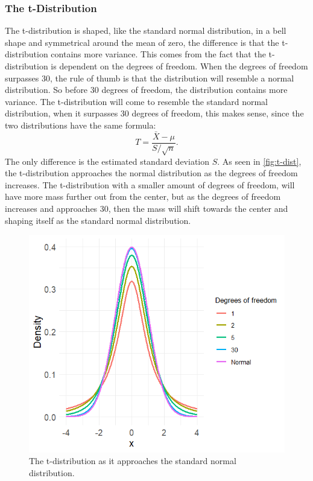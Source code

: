 \subsubsection{The t-Distribution}
The t-distribution is shaped, like the standard normal distribution, in a bell shape and symmetrical around the mean of zero, the difference is that the t-distribution contains more variance. This comes from the fact that the t-distribution is dependent on the degrees of freedom. When the degrees of freedom surpasses 30, the rule of thumb is that the distribution will resemble a normal distribution. So before 30 degrees of freedom, the distribution contains more variance.
The t-distribution will come to resemble the standard normal distribution, when it surpasses 30 degrees of freedom, this makes sense, since the two distributions have the same formula:
\begin{equation}
	T=\frac{\bar{X}-\mu}{S/\sqrt{n}}.
\end{equation}
The only difference is the estimated standard deviation $S$.
As seen in \autoref{fig:t-dist}, the t-distribution approaches the normal distribution as the degrees of freedom increases. The t-distribution with a smaller amount of degrees of freedom, will have more mass further out from the center, but as the degrees of freedom increases and approaches 30, then the mass will shift towards the center and shaping itself as the standard normal distribution.
\begin{figure}[h!]
	\centering
	\begin{minipage}{0.80\textwidth}
		\centering
		\includegraphics[width=\linewidth]{billder/T-distribution.png}
		\caption{The t-distribution as it approaches the standard normal distribution.}
		\label{fig:t-dist}
	\end{minipage}\hfill
\end{figure}
